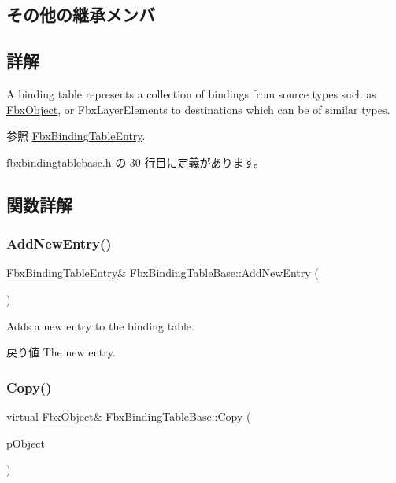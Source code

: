 \subsection*{その他の継承メンバ}


\subsection{詳解}
A binding table represents a collection of bindings from source types such as \hyperlink{class_fbx_object}{Fbx\+Object}, or Fbx\+Layer\+Elements to destinations which can be of similar types. \begin{DoxySeeAlso}{参照}
\hyperlink{class_fbx_binding_table_entry}{Fbx\+Binding\+Table\+Entry}. 
\end{DoxySeeAlso}


 fbxbindingtablebase.\+h の 30 行目に定義があります。



\subsection{関数詳解}
\mbox{\label{class_fbx_binding_table_base_a2ebf180e80538abf0e6512a8ca30ee10}} 
\subsubsection{\texorpdfstring{Add\+New\+Entry()}{AddNewEntry()}}
{\footnotesize\ttfamily \hyperlink{class_fbx_binding_table_entry}{Fbx\+Binding\+Table\+Entry}\& Fbx\+Binding\+Table\+Base\+::\+Add\+New\+Entry (\begin{DoxyParamCaption}{ }\end{DoxyParamCaption})}

Adds a new entry to the binding table. \begin{DoxyReturn}{戻り値}
The new entry. 
\end{DoxyReturn}
\mbox{\label{class_fbx_binding_table_base_a9181d090913b604fd10a0a660a6e823b}} 
\subsubsection{\texorpdfstring{Copy()}{Copy()}}
{\footnotesize\ttfamily virtual \hyperlink{class_fbx_object}{Fbx\+Object}\& Fbx\+Binding\+Table\+Base\+::\+Copy (\begin{DoxyParamCaption}\item[{const \hyperlink{class_fbx_object}{Fbx\+Object} \&}]{p\+Object }\end{DoxyParamCaption})\hspace{0.3cm}{\ttfamily [virtual]}}

